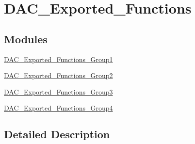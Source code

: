 \hypertarget{group___d_a_c___exported___functions}{}\section{D\+A\+C\+\_\+\+Exported\+\_\+\+Functions}
\label{group___d_a_c___exported___functions}
\subsection*{Modules}
\begin{DoxyCompactItemize}
\item 
\mbox{\hyperlink{group___d_a_c___exported___functions___group1}{D\+A\+C\+\_\+\+Exported\+\_\+\+Functions\+\_\+\+Group1}}
\item 
\mbox{\hyperlink{group___d_a_c___exported___functions___group2}{D\+A\+C\+\_\+\+Exported\+\_\+\+Functions\+\_\+\+Group2}}
\item 
\mbox{\hyperlink{group___d_a_c___exported___functions___group3}{D\+A\+C\+\_\+\+Exported\+\_\+\+Functions\+\_\+\+Group3}}
\item 
\mbox{\hyperlink{group___d_a_c___exported___functions___group4}{D\+A\+C\+\_\+\+Exported\+\_\+\+Functions\+\_\+\+Group4}}
\end{DoxyCompactItemize}


\subsection{Detailed Description}
